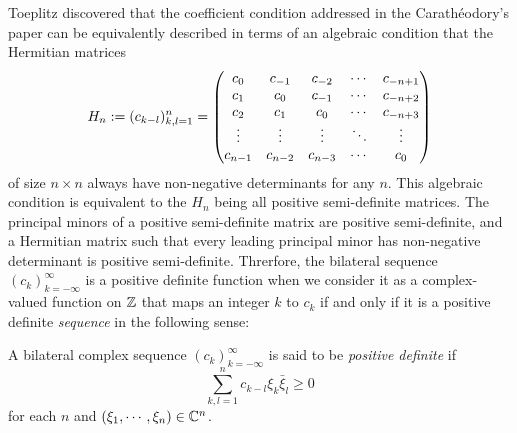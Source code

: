 \documentclass{../../small}
\begin{document}
Toeplitz discovered that the coefficient condition addressed in the Carath\'eodory's paper can be equivalently described in terms of an algebraic condition that the Hermitian matrices
\[H_n:=(c_{k-l})_{k,l=1}^n=\begin{pmatrix}c_0&c_{-1}&c_{-2}&\cdots&c_{-n+1}\\c_1&c_0&c_{-1}&\cdots&c_{-n+2}\\c_2&c_1&c_0&\cdots&c_{-n+3}\\\vdots&\vdots&\vdots&\ddots&\vdots\\c_{n-1}&c_{n-2}&c_{n-3}&\cdots&c_0\end{pmatrix}\]
of size $n\times n$ always have non-negative determinants for any $n$.
This algebraic condition is equivalent to the $H_n$ being all positive semi-definite matrices.
The principal minors of a positive semi-definite matrix are positive semi-definite, and a Hermitian matrix such that every leading principal minor has non-negative determinant is positive semi-definite.
Threrfore, the bilateral sequence $(c_k)_{k=-\infty}^\infty$ is a positive definite function when we consider it as a complex-valued function on $\mathbb{Z}$ that maps an integer $k$ to $c_k$ if and only if it is a positive definite \emph{sequence} in the following sense:

\begin{defn}
A bilateral complex sequence $(c_k)_{k=-\infty}^\infty$ is said to be \emph{positive definite} if
\[\sum_{k,l=1}^nc_{k-l}\xi_k\bar\xi_l\ge0\]
for each $n$ and $(\xi_1,\cdots,\xi_n)\in\mathbb{C}^n$.
\end{defn}
\end{document}
